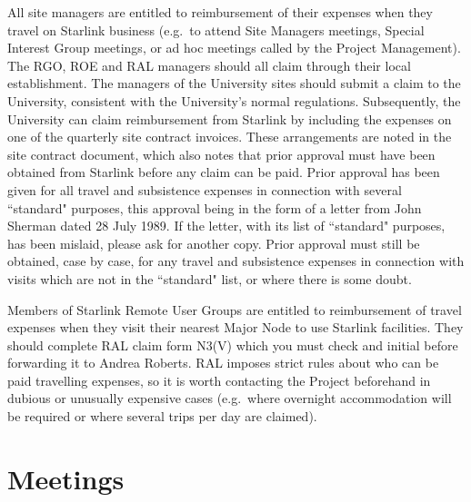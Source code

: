 All site managers are entitled to reimbursement of their expenses when they
travel on Starlink business (e.g.\ to attend Site Managers meetings, Special
Interest Group meetings, or ad hoc meetings called by the Project Management).
The RGO, ROE and RAL managers should all claim through their local
establishment.
The managers of the University sites should submit a claim to the University,
consistent with the University's normal regulations.
Subsequently, the University can claim reimbursement from Starlink by including
the expenses on one of the quarterly site contract invoices.
These arrangements are noted in the site contract document, which also notes
that prior approval must have been obtained from Starlink before any claim
can be paid.
Prior approval has been given for all travel and subsistence expenses in
connection with several ``standard" purposes, this approval being in the
form of a letter from John Sherman dated 28 July 1989.
If the letter, with its list of ``standard" purposes, has been mislaid, please
ask for another copy.
Prior approval must still be obtained, case by case, for any travel and
subsistence expenses in connection with visits which are not in the ``standard"
list, or where there is some doubt.

Members of Starlink Remote User Groups are entitled to reimbursement of travel
expenses when they visit their nearest Major Node to use Starlink facilities.
They should complete RAL claim form N3(V) which you must check and initial
before forwarding it to Andrea Roberts.
RAL imposes strict rules about who can be paid travelling expenses, so it is
worth contacting the Project beforehand in dubious or unusually expensive cases
(e.g.\ where overnight accommodation will be required or where several trips
per day are claimed).

\section {Meetings}


